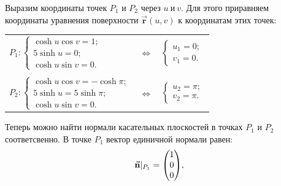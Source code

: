 \documentclass[12pt,a4paper]{article}
\newcommand{\boldVec}[1]{\vec{\mathbf #1}}
\begin{document}
    Выразим координаты точек $ P_1 $ и $ P_2 $ через $ u \ \text{и} \ v $. Для этого приравняем координаты уравнения поверхности $ \boldVec r(u, v) $ к координатам этих точек:
    \begin{table}[h]
        \centering
        \begin{tabular}{lcl}
            $
                P_1: 
                \begin{cases}
                    \cosh u \cos v = 1;
                    \\
                    5 \sinh u = 0;
                    \\
                    \cosh u \sin v = 0.
                \end{cases} 
            $ 
            & $ \Leftrightarrow $ & 
            $
                \begin{cases}
                    u_1 = 0;
                    \\
                    v_1 = 0.
                \end{cases}
            $

            \\ \\

            $
                P_2: 
                \begin{cases}
                    \cosh u \cos v = -\cosh \pi;
                    \\
                    5 \sinh u =  5 \sinh \pi;
                    \\
                    \cosh u \sin v = 0.
                \end{cases}
            $ 
            & $ \Leftrightarrow $ & 
            $
                \begin{cases}
                    u_2 = \pi;
                    \\
                    v_2 = \pi.
                \end{cases}
            $

        \end{tabular}
    \end{table}

    Теперь можно найти нормали касательных плоскостей в точках $ P_1 $ и $ P_2 $ соответсвенно. В точке $ {P_1} $ вектор единичной нормали равен:
    \[
        \vec{\textbf n}|_{P_1} =
        \begin{pmatrix}
            1 
            \\ 
            0 
            \\ 
            0  
        \end{pmatrix}\! ,
    \]
\end{document}
